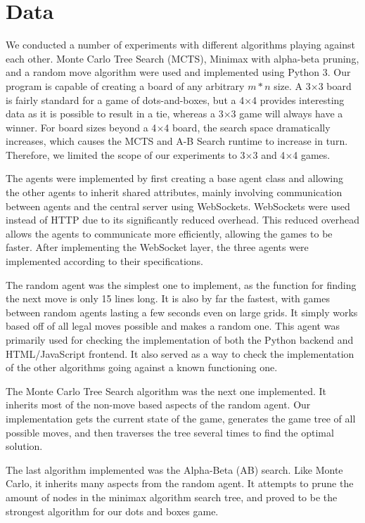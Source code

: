 \documentclass[12pt]{article}
\begin{document}
    \section{Data}
    We conducted a number of experiments with different algorithms playing against each other. Monte Carlo Tree Search (MCTS), Minimax with alpha-beta pruning, and a random move algorithm were used and implemented using Python 3. Our program is capable of creating a board of any arbitrary \(m*n\) size. A 3\(\times\)3 board is fairly standard for a game of dots-and-boxes, but a 4\(\times\)4 provides interesting data as it is possible to result in a tie, whereas a 3\(\times\)3 game will always have a winner. For board sizes beyond a 4\(\times\)4 board, the search space dramatically increases, which causes the MCTS and A-B Search runtime to increase in turn. Therefore, we limited the scope of our experiments to 3\(\times\)3 and 4\(\times\)4 games.

    The agents were implemented by first creating a base agent class and allowing the other agents to inherit shared attributes, mainly involving communication between agents and the central server using WebSockets. WebSockets were used instead of HTTP due to its significantly reduced overhead. This reduced overhead allows the agents to communicate more efficiently, allowing the games to be faster. After implementing the WebSocket layer, the three agents were implemented according to their specifications.

    The random agent was the simplest one to implement, as the function for finding the next move is only 15 lines long. It is also by far the fastest, with games between random agents lasting a few seconds even on large grids. It simply works based off of all legal moves possible and makes a random one. This agent was primarily used for checking the implementation of both the Python backend and HTML/JavaScript frontend. It also served as a way to check the implementation of the other algorithms going against a known functioning one.

    The Monte Carlo Tree Search algorithm was the next one implemented. It inherits most of the non-move based aspects of the random agent. Our implementation gets the current state of the game, generates the game tree of all possible moves, and then traverses the tree several times to find the optimal solution.

    The last algorithm implemented was the Alpha-Beta (AB) search. Like Monte Carlo, it inherits many aspects from the random agent. It attempts to prune the amount of nodes in the minimax algorithm search tree, and proved to be the strongest algorithm for our dots and boxes game.
\end{document}
